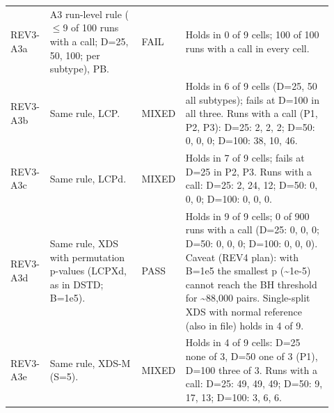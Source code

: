 \begin{table}[p]
\begin{tabular}{@{}>{\raggedright\arraybackslash}p{0.100\linewidth}>{\raggedright\arraybackslash}p{0.285\linewidth}>{\raggedright\arraybackslash}p{0.085\linewidth}>{\raggedright\arraybackslash}p{0.450\linewidth}@{}}
REV3-A3a & A3 run-level rule ($\le$9 of 100 runs with a call; D=25, 50, 100; per subtype), PB. & FAIL & Holds in 0 of 9 cells; 100 of 100 runs with a call in every cell. \\
REV3-A3b & Same rule, LCP. & MIXED & Holds in 6 of 9 cells (D=25, 50 all subtypes); fails at D=100 in all three. Runs with a call (P1, P2, P3): D=25: 2, 2, 2; D=50: 0, 0, 0; D=100: 38, 10, 46. \\
REV3-A3c & Same rule, LCPd. & MIXED & Holds in 7 of 9 cells; fails at D=25 in P2, P3. Runs with a call: D=25: 2, 24, 12; D=50: 0, 0, 0; D=100: 0, 0, 0. \\
REV3-A3d & Same rule, XDS with permutation p-values (LCPXd, as in DSTD; B=1e5). & PASS & Holds in 9 of 9 cells; 0 of 900 runs with a call (D=25: 0, 0, 0; D=50: 0, 0, 0; D=100: 0, 0, 0). Caveat (REV4 plan): with B=1e5 the smallest p (\textasciitilde{}1e-5) cannot reach the BH threshold for \textasciitilde{}88,000 pairs. Single-split XDS with normal reference (also in file) holds in 4 of 9. \\
REV3-A3e & Same rule, XDS-M (S=5). & MIXED & Holds in 4 of 9 cells: D=25 none of 3, D=50 one of 3 (P1), D=100 three of 3. Runs with a call: D=25: 49, 49, 49; D=50: 9, 17, 13; D=100: 3, 6, 6. \\
\bottomrule
\end{tabular}
\end{table}

